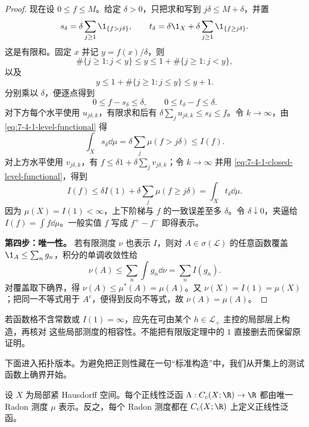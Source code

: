 \begin{proof}
现在设 $0\le f\le M$。给定 $\delta>0$，只把求和写到 $j\delta\le M+\delta$，并置
\[
 s_\delta=\delta\sum_{j\ge1}\1_{\{f>j\delta\}},
 \qquad
 t_\delta=\delta\1_X+
 \delta\sum_{j\ge1}\1_{\{f\ge j\delta\}}.
\]
这是有限和。固定 $x$ 并记 $y=f(x)/\delta$，则
\[
 \#\{j\geq1:j<y\}\leq y
 \leq1+\#\{j\geq1:j<y\},
\]
以及
\[
 y\leq1+\#\{j\geq1:j\leq y\}\leq y+1.
\]
分别乘以 $\delta$，便逐点得到
\[
 0\le f-s_\delta\le\delta,\qquad
 0\le t_\delta-f\le\delta.
\]
对下方每个水平使用 $u_{j\delta,k}$，有限求和后有
$\delta\sum_ju_{j\delta,k}\le s_\delta\le f$。令 $k\to\infty$，由
\eqref{eq:7-4-1-level-functional} 得
\[
 \int_Xs_\delta\dd\mu
 =\delta\sum_j\mu(f>j\delta)\le I(f).
\]
对上方水平使用 $v_{j\delta,k}$，有
$f\le\delta1+\delta\sum_jv_{j\delta,k}$；令 $k\to\infty$ 并用
\eqref{eq:7-4-1-closed-level-functional}，得到
\[
 I(f)\le\delta I(1)+\delta\sum_j\mu(f\ge j\delta)
 =\int_Xt_\delta\dd\mu.
\]
因为 $\mu(X)=I(1)<\infty$，上下阶梯与 $f$ 的一致误差至多 $\delta$。令 $\delta\downarrow0$，夹逼给
$I(f)=\int f\dd\mu$。一般实值 $f$ 写成 $f^+-f^-$ 即得表示。

\textbf{第四步：唯一性。}
若有限测度 $\nu$ 也表示 $I$，则对 $A\in\sigma(\mathcal L)$ 的任意函数覆盖
$\1_A\le\sum_ng_n$，积分的单调收敛性给
\[
 \nu(A)\le\sum_n\int g_n\dd\nu=\sum_nI(g_n).
\]
对覆盖取下确界，得 $\nu(A)\le\mu^*(A)=\mu(A)$。又
$\nu(X)=I(1)=\mu(X)$；把同一不等式用于 $A^c$，便得到反向不等式，故 $\nu(A)=\mu(A)$。
\end{proof}

若函数格不含常数或 $I(1)=\infty$，应先在可由某个 $h\in\mathcal L_+$ 主控的局部层上构造，再核对
这些局部测度的相容性。不能把有限版定理中的 $1$ 直接删去而保留原证明。

下面进入拓扑版本。为避免把正则性藏在一句“标准构造”中，我们从开集上的测试函数上确界开始。

\begin{theorem}\label{theorem:7-4-1-2}
设 $X$ 为局部紧 Hausdorff 空间。每个正线性泛函
$\Lambda:C_c(X;\R)\to\R$ 都由唯一 Radon 测度 $\mu$ 表示。反之，每个 Radon 测度都在
$C_c(X;\R)$ 上定义正线性泛函。
\end{theorem}

